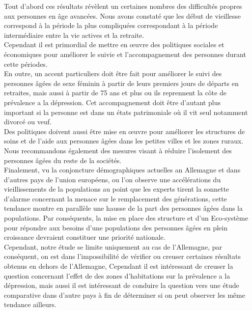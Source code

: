 \documentclass[a4paper]{article}
\begin{document}
Tout d’abord ces résultats révèlent un certaines nombres des difficultés propres aux personnes en âge avancées.
Nous avons constaté que les début de vieillesse  correspond à la période la plus compliquées correspondant à la période intermédiaire entre la vie actives et la retraite.\\
 
Cependant il est primordial de mettre en œuvre des politiques sociales et économiques pour améliorer le suivie et l’accompagnement des personnes durant cette périodes.\\

En outre, un accent particuliers doit être fait pour améliorer le suivi des personnes âgées de sexe féminin à partir de leurs premiers jours de départs en retraites, mais aussi à partir de 75 ans et plus ou ils reprennent la côte de prévalence a la dépression. Cet accompagnement doit être d’autant plus important si la personne est dans un états patrimoniale où il vit seul notamment divorcé ou veuf.\\

Des politiques doivent aussi être mise en œuvre pour améliorer les structures de soins et de l’aide aux personnes  âgées dans les petites villes et les zones ruraux.\\

Nous recommandons également des mesures visant à réduire l’isolement des personnes âgées du reste de la sociétés.\\

Finalement, vu la conjoncture démographiques actuelles an Allemagne et dans d’autres pays de l’union européens, ou l’on observe une accélérations du vieillissements de la populations au point que les experts tirent la sonnette d’alarme concernant la menace sur le remplacement des générations, cette tendance montre en parallèle une hausse de la part des personnes âgées dans la populations. Par conséquents, la mise en place des structure et d’un Eco-système  pour répondre aux besoins d’une populations des personnes âgées en plein croissance devraient constituer une priorité nationale.\\

Cependant, notre étude se limite uniquement au cas de l’Allemagne, par conséquent, on est dans l’impossibilité de vérifier ou creuser certaines résultats obtenus en dehors de l’Allemagne, Cependant il est intéressant de creuser la question concernant l’effet de des zones d’habitations sur la prévalence a la dépression, mais aussi il est intéressant de conduire la question vers une étude comparative dans d’autre pays à fin de déterminer si on peut observer les même tendance ailleurs.
\end{document}
